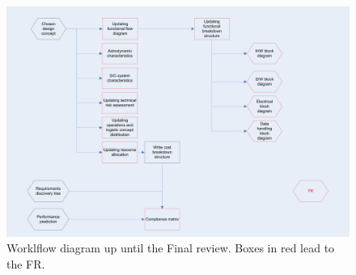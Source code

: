 \newpage
\begin{figure}
\begin{center}
\includegraphics[width=1.2\textwidth, angle=90]{chapters/img/Workflow_diagram_FR.jpg}
\end{center}
\caption{Worklflow diagram up until the Final review. Boxes in red lead to the FR.}
\end{figure}